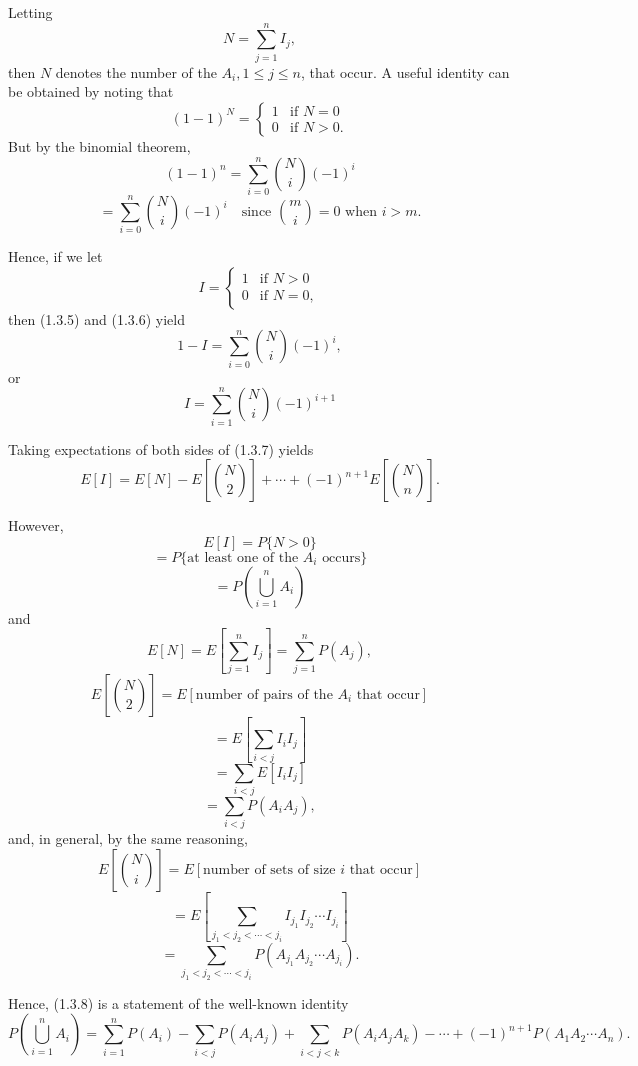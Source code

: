 \documentclass[lang=cn,10pt,thmcnt=section]{elegantbook}
\begin{document}
Letting
\[
N = \sum_{j=1}^{n} I_j,
\]
then \(N\) denotes the number of the \(A_i, 1 \leq j \leq n\), that occur. A useful identity can be obtained by noting that
\begin{equation}
(1 - 1)^N = \begin{cases}
1 & \text{if } N = 0 \\
0 & \text{if } N > 0.
\end{cases}
\end{equation}
But by the binomial theorem,
\begin{equation}
(1 - 1)^n = \sum_{i=0}^{n} \binom{N}{i} (-1)^i
\end{equation}
\[
= \sum_{i=0}^{n} \binom{N}{i} (-1)^i \quad \text{since } \binom{m}{i} = 0 \text{ when } i > m.
\]

Hence, if we let
\[
I = \begin{cases}
1 & \text{if } N > 0 \\
0 & \text{if } N = 0,
\end{cases}
\]
then (1.3.5) and (1.3.6) yield
\[
1 - I = \sum_{i=0}^{n} \binom{N}{i} (-1)^i,
\]
or
\begin{equation}
I = \sum_{i=1}^{n} \binom{N}{i} (-1)^{i+1}
\end{equation}

Taking expectations of both sides of (1.3.7) yields
\begin{equation}
E[I] = E[N] - E\left[\binom{N}{2}\right] + \cdots + (-1)^{n+1} E\left[\binom{N}{n}\right].
\end{equation}

However,
\[
E[I] = P\{N > 0\}
\]
\[
= P\{\text{at least one of the } A_i \text{ occurs}\}
\]
\[
= P\left(\bigcup_{i=1}^{n} A_i\right)
\]
and
\[
E[N] = E\left[\sum_{j=1}^{n} I_j\right] = \sum_{j=1}^{n} P(A_j),
\]
\[
E\left[\binom{N}{2}\right] = E[\text{number of pairs of the } A_i \text{ that occur}]
\]
\[
= E\left[\sum_{i<j} I_i I_j\right]
\]
\[
= \sum_{i<j} E[I_i I_j]
\]
\[
= \sum_{i<j} P(A_i A_j),
\]
and, in general, by the same reasoning,
\[
E\left[\binom{N}{i}\right] = E[\text{number of sets of size } i \text{ that occur}]
\]
\[
= E\left[\sum_{j_1 < j_2 < \cdots < j_i} I_{j_1} I_{j_2} \cdots I_{j_i}\right]
\]
\[
= \sum_{j_1 < j_2 < \cdots < j_i} P(A_{j_1} A_{j_2} \cdots A_{j_i}).
\]

Hence, (1.3.8) is a statement of the well-known identity
\[
P\left(\bigcup_{i=1}^{n} A_i\right) = \sum_{i=1}^{n} P(A_i) - \sum_{i<j} P(A_i A_j) + \sum_{i<j<k} P(A_i A_j A_k) - \cdots + (-1)^{n+1} P(A_1 A_2 \cdots A_n).
\]
\end{document}

